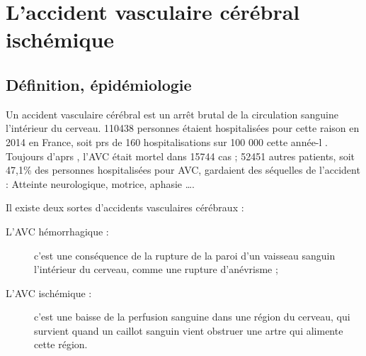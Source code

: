 \section{L'accident vasculaire c\'er\'ebral isch\'emique}




\subsection{D\'efinition, \'epid\'emiologie}

Un accident vasculaire c\'er\'ebral est un arr\^et brutal de la circulation sanguine  l'int\'erieur du cerveau. %
110438 personnes \'etaient hospitalis\'ees pour cette raison en 2014 en France, soit prs de 160 hospitalisations sur 100 000 cette ann\'ee-l \cite{epi_hem16}. %
Toujours d'aprs \cite{epi_hem16}, l'AVC \'etait mortel dans 15744 cas ; %
52451 autres patients, soit 47,1\% des personnes hospitalis\'ees pour AVC, gardaient des s\'equelles de l'accident : %
Atteinte neurologique, motrice, aphasie \dots.

\par
Il existe deux sortes d'accidents vasculaires c\'er\'ebraux :
\begin{description}
\item[L'AVC h\'emorrhagique : ] c'est une cons\'equence de la rupture de la paroi d'un vaisseau sanguin  l'int\'erieur du cerveau, comme une rupture d'an\'evrisme ;
\item[L'AVC isch\'emique : ] c'est une baisse de la perfusion sanguine dans une r\'egion du cerveau, %
qui survient quand un caillot sanguin vient obstruer une artre qui alimente cette r\'egion.
\end{description}

